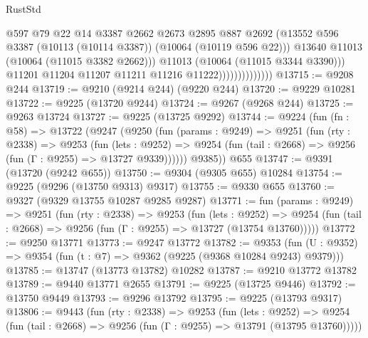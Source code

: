 \begin{lexlean}{RustStd}
\begin{coremodule}
                                    @597
                                    @79
                                    @22
                                    @14
                                    @3387
                                    @2662
                                    @2673
                                    @2895
                                    @887
                                    @2692
                                    (@13552
                                      @596
                                      @3387
                                      (@10113 (@10114 @3387))
                                      (@10064 (@10119 @596 @22)))
                                    @13640
                                    @11013
                                    (@10064 (@11015 @3382 @2662)))
                                  @11013
                                  (@10064 (@11015 @3344 @3390)))
                                @11201
                                @11204
                                @11207
                                @11211
                                @11216
                                @11222))))))))))))))
@13715 := @9208 @244
@13719 := @9210 (@9214 @244) (@9220 @244)
@13720 := @9229 @10281
@13722 := @9225 (@13720 @9244)
@13724 := @9267 (@9268 @244)
@13725 := @9263 @13724
@13727 := @9225 (@13725 @9292)
@13744 := @9224
    (fun (fn : @58) =>
    @13722
      (@9247
        (@9250
          (fun (params : @9249) =>
          @9251
            (fun (rty : @2338) =>
            @9253
              (fun (lets : @9252) =>
              @9254 (fun (tail : @2668) => @9256 (fun (Γ : @9255) => @13727 @9339))))))
        @9385))
    @655
@13747 := @9391 (@13720 (@9242 @655))
@13750 := @9304 (@9305 @655) @10284
@13754 := @9225 (@9296 (@13750 @9313) @9317)
@13755 := @9330 @655
@13760 := @9327 (@9329 @13755 @10287 @9285 @9287)
@13771 := fun (params : @9249) =>
  @9251
    (fun (rty : @2338) =>
    @9253
      (fun (lets : @9252) =>
      @9254 (fun (tail : @2668) => @9256 (fun (Γ : @9255) => @13727 (@13754 @13760)))))
@13772 := @9250 @13771
@13773 := @9247 @13772
@13782 := @9353
    (fun (U : @9352) => @9354 (fun (t : @7) => @9362 (@9225 (@9368 @10284 @9243) @9379)))
@13785 := @13747 (@13773 @13782) @10282
@13787 := @9210 @13772 @13782
@13789 := @9440 @13771 @2655
@13791 := @9225 (@13725 @9446)
@13792 := @13750 @9449
@13793 := @9296 @13792
@13795 := @9225 (@13793 @9317)
@13806 := @9443
    (fun (rty : @2338) =>
    @9253
      (fun (lets : @9252) =>
      @9254 (fun (tail : @2668) => @9256 (fun (Γ : @9255) => @13791 (@13795 @13760)))))

\end{coremodule}
\end{lexlean}
